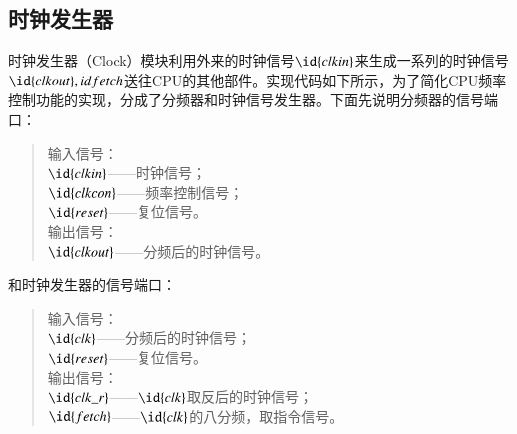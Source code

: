 \documentclass[titlepage, 11pt]{article}
\begin{document}
		\subsection{时钟发生器}
		时钟发生器（Clock）模块利用外来的时钟信号$\id{clkin}$来生成一系列的时钟信号$\id{clkout},id{fetch}$送往CPU的其他部件。实现代码如下所示，为了简化CPU频率控制功能的实现，分成了分频器和时钟信号发生器。下面先说明分频器的信号端口：
		\begin{quote}
		输入信号：\\
		$\id{clkin}$——时钟信号；\\
		$\id{clkcon}$——频率控制信号；\\
		$\id{reset}$——复位信号。\\
		输出信号：\\
		$\id{clkout}$——分频后的时钟信号。
		\end{quote}\par 
		和时钟发生器的信号端口：
		\begin{quote}
		输入信号：\\
		$\id{clk}$——分频后的时钟信号；\\
		$\id{reset}$——复位信号。\\
		输出信号：\\
		$\id{clk\_r}$——$\id{clk}$取反后的时钟信号；\\
		$\id{fetch}$——$\id{clk}$的八分频，取指令信号。
		\end{quote}
\end{document}
